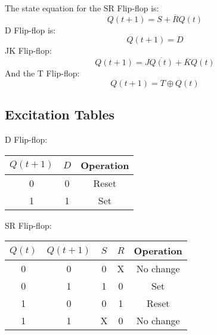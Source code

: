 \documentclass[12pt letter]{report}
\begin{document}
The state equation for the SR Flip-flop is:
\[
  Q \left( t + 1 \right)  = S + \overline{R} Q \left( t \right)
\]
D Flip-flop is:
\[
  Q \left( t + 1 \right) = D
\]
JK Flip-flop:
\[
  Q \left( t + 1 \right)  = J \overline{Q \left( t \right) } + \overline{K}Q \left( t \right)
\]
And the T Flip-flop:
\[
  Q \left( t + 1 \right) = T \oplus Q \left( t \right)
\]

\subsection{Excitation Tables}


D Flip-flop:
\begin{table}[h!]
  \begin{center}
    \begin{tabular}{|c|c|c|}
      \hline
      $Q \left( t + 1 \right) $ & $D$ & Operation \\ [0.5ex]
      \hline
      \hline
      0                         & 0   & Reset     \\
      1                         & 1   & Set       \\
      \hline
    \end{tabular}
  \end{center}
\end{table}

SR Flip-flop:
\begin{table}[H]
  \begin{center}
    \begin{tabular}{|c c|c c|c|}
      \hline
      $Q \left( t \right) $ & $Q \left( t + 1 \right) $ & $S$ & $R$ & Operation \\ [0.5ex]
      \hline
      \hline
      0                     & 0                         & 0   & X   & No change \\
      0                     & 1                         & 1   & 0   & Set       \\
      1                     & 0                         & 0   & 1   & Reset     \\
      1                     & 1                         & X   & 0   & No change \\
      \hline
    \end{tabular}
  \end{center}
\end{table}
\end{document}
